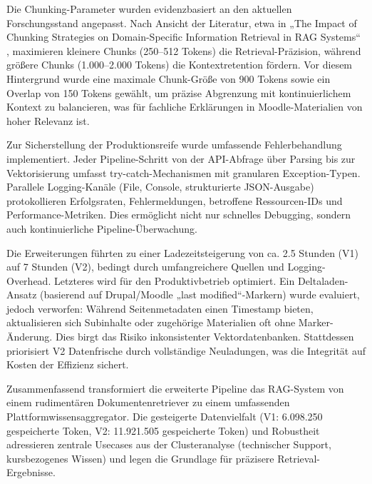 Die Chunking-Parameter wurden evidenzbasiert an den aktuellen Forschungsstand angepasst. Nach Ansicht der Literatur, etwa in „The Impact of Chunking Strategies on Domain-Specific Information Retrieval in RAG Systems“ \cite{11125724}, maximieren kleinere Chunks (250–512 Tokens) die Retrieval-Präzision, während größere Chunks (1.000–2.000 Tokens) die Kontextretention fördern. Vor diesem Hintergrund wurde eine maximale Chunk-Größe von 900 Tokens sowie ein Overlap von 150 Tokens gewählt, um präzise Abgrenzung mit kontinuierlichem Kontext zu balancieren, was für fachliche Erklärungen in Moodle-Materialien von hoher Relevanz ist.

Zur Sicherstellung der Produktionsreife wurde umfassende Fehlerbehandlung implementiert. Jeder Pipeline-Schritt von der API-Abfrage über Parsing bis zur Vektorisierung umfasst try-catch-Mechanismen mit granularen Exception-Typen. Parallele Logging-Kanäle (File, Console, strukturierte JSON-Ausgabe) protokollieren Erfolgsraten, Fehlermeldungen, betroffene Ressourcen-IDs und Performance-Metriken. Dies ermöglicht nicht nur schnelles Debugging, sondern auch kontinuierliche Pipeline-Überwachung.

Die Erweiterungen führten zu einer Ladezeitsteigerung von ca. 2.5 Stunden (V1) auf 7 Stunden (V2), bedingt durch umfangreichere Quellen und Logging-Overhead. Letzteres wird für den Produktivbetrieb optimiert. Ein Deltaladen-Ansatz (basierend auf Drupal/Moodle „last modified“-Markern) wurde evaluiert, jedoch verworfen: Während Seitenmetadaten einen Timestamp bieten, aktualisieren sich Subinhalte oder zugehörige Materialien oft ohne Marker-Änderung. Dies birgt das Risiko inkonsistenter Vektordatenbanken. Stattdessen priorisiert V2 Datenfrische durch vollständige Neuladungen, was die Integrität auf Kosten der Effizienz sichert.

Zusammenfassend transformiert die erweiterte Pipeline das RAG-System von einem rudimentären Dokumentenretriever zu einem umfassenden Plattformwissensaggregator. Die gesteigerte Datenvielfalt (V1: 6.098.250 gespeicherte Token, V2: 11.921.505 gespeicherte Token) und Robustheit adressieren zentrale Usecases aus der Clusteranalyse (technischer Support, kursbezogenes Wissen) und legen die Grundlage für präzisere Retrieval-Ergebnisse.

